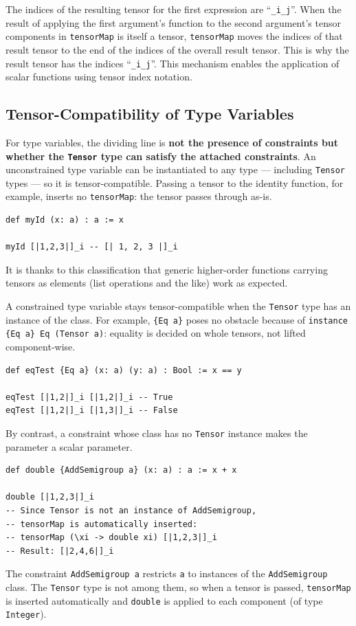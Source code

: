 The indices of the resulting tensor for the first expression are ``\lstinline|_i_j|''.
When the result of applying the first argument's function to the second argument's tensor components in \lstinline{tensorMap} is itself a tensor, \lstinline{tensorMap} moves the indices of that result tensor to the end of the indices of the overall result tensor.
This is why the result tensor has the indices ``\lstinline|_i_j|''.
This mechanism enables the application of scalar functions using tensor index notation.

\subsection{Tensor-Compatibility of Type Variables}

For type variables, the dividing line is \textbf{not the presence of constraints but whether the \lstinline{Tensor} type can satisfy the attached constraints}.
An unconstrained type variable can be instantiated to any type --- including \lstinline{Tensor} types --- so it is tensor-compatible.
Passing a tensor to the identity function, for example, inserts no \lstinline{tensorMap}: the tensor passes through as-is.
\begin{lstlisting}[language=egison,numbers=none]
def myId (x: a) : a := x

myId [|1,2,3|]_i -- [| 1, 2, 3 |]_i
\end{lstlisting}
It is thanks to this classification that generic higher-order functions carrying tensors as elements (list operations and the like) work as expected.

A constrained type variable stays tensor-compatible when the \lstinline{Tensor} type has an instance of the class.
For example, \lstinline|{Eq a}| poses no obstacle because of \lstinline|instance {Eq a} Eq (Tensor a)|: equality is decided on whole tensors, not lifted component-wise.
\begin{lstlisting}[language=egison,numbers=none]
def eqTest {Eq a} (x: a) (y: a) : Bool := x == y

eqTest [|1,2|]_i [|1,2|]_i -- True
eqTest [|1,2|]_i [|1,3|]_i -- False
\end{lstlisting}

By contrast, a constraint whose class has no \lstinline{Tensor} instance makes the parameter a scalar parameter.
\begin{lstlisting}[language=egison,numbers=none]
def double {AddSemigroup a} (x: a) : a := x + x

double [|1,2,3|]_i
-- Since Tensor is not an instance of AddSemigroup,
-- tensorMap is automatically inserted:
-- tensorMap (\xi -> double xi) [|1,2,3|]_i
-- Result: [|2,4,6|]_i
\end{lstlisting}
The constraint \lstinline{AddSemigroup a} restricts \lstinline{a} to instances of the \lstinline{AddSemigroup} class.
The \lstinline{Tensor} type is not among them, so when a tensor is passed, \lstinline{tensorMap} is inserted automatically and \lstinline{double} is applied to each component (of type \lstinline{Integer}).


